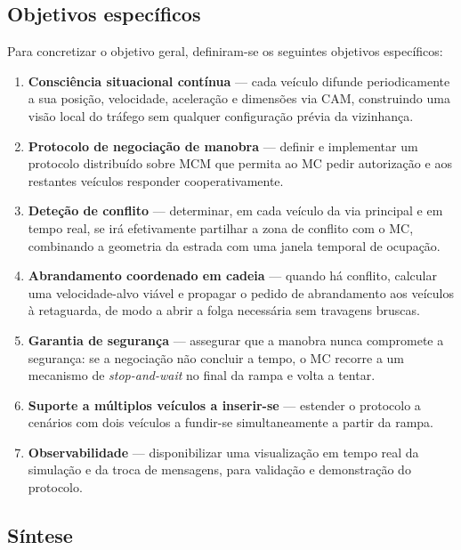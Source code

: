 \documentclass[11pt,a4paper]{article}
\begin{document}
\subsection{Objetivos específicos}

Para concretizar o objetivo geral, definiram-se os seguintes objetivos específicos:

\begin{enumerate}[noitemsep,topsep=2pt,label=\textbf{O\arabic*.}]
  \item \textbf{Consciência situacional contínua} --- cada veículo difunde periodicamente
        a sua posição, velocidade, aceleração e dimensões via CAM, construindo uma visão
        local do tráfego sem qualquer configuração prévia da vizinhança.
  \item \textbf{Protocolo de negociação de manobra} --- definir e implementar um protocolo
        distribuído sobre MCM que permita ao MC pedir autorização e aos restantes veículos
        responder cooperativamente.
  \item \textbf{Deteção de conflito} --- determinar, em cada veículo da via principal e em
        tempo real, se irá efetivamente partilhar a zona de conflito com o MC, combinando
        a geometria da estrada com uma janela temporal de ocupação.
  \item \textbf{Abrandamento coordenado em cadeia} --- quando há conflito, calcular uma
        velocidade-alvo viável e propagar o pedido de abrandamento aos veículos à retaguarda,
        de modo a abrir a folga necessária sem travagens bruscas.
  \item \textbf{Garantia de segurança} --- assegurar que a manobra nunca compromete a
        segurança: se a negociação não concluir a tempo, o MC recorre a um mecanismo de
        \emph{stop-and-wait} no final da rampa e volta a tentar.
  \item \textbf{Suporte a múltiplos veículos a inserir-se} --- estender o protocolo a
        cenários com dois veículos a fundir-se simultaneamente a partir da rampa.
  \item \textbf{Observabilidade} --- disponibilizar uma visualização em tempo real da
        simulação e da troca de mensagens, para validação e demonstração do protocolo.
\end{enumerate}

\subsection{Síntese}
\end{document}
